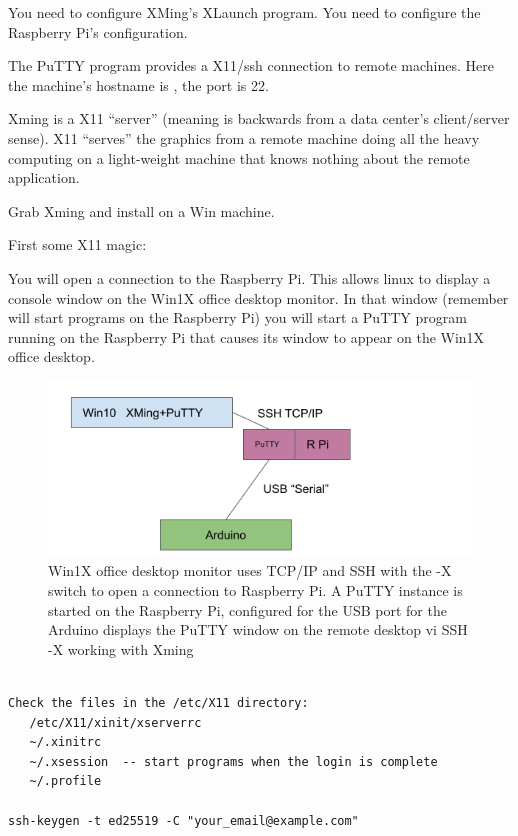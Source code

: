 You need to configure XMing's XLaunch program. You need to configure the
Raspberry Pi's configuration.


The PuTTY program provides a X11/ssh connection to remote machines. Here
the machine's hostname is , the port is 22.

Xming is a X11 ``server'' (meaning is backwards from a data center's
client/server sense). X11 ``serves'' the graphics from a remote machine
doing all the heavy computing on a light-weight machine that knows nothing
about the remote application.

Grab Xming and install on a Win machine.

First some X11 magic:

You will open a  connection to the Raspberry Pi. This
allows linux to display a console window on the Win1X office desktop
monitor. In that window (remember will start programs on the Raspberry
Pi) you will start a PuTTY program running on the Raspberry Pi that
causes its window to appear on the Win1X office desktop.

\begin{figure}[h!]
\centering
\includegraphics[width=.5\textwidth]{images/PuTTYDiagram1.png}
\caption[Win1X use.]{Win1X office desktop monitor uses TCP/IP and SSH
  with the -X switch to open a connection to Raspberry Pi. A PuTTY
  instance is started on the Raspberry Pi, configured for the USB port
  for the Arduino displays the PuTTY window on the remote desktop vi
  SSH -X working with Xming} %
\label{figure:Diagram1}
\end{figure}

\begingroup \fontsize{10pt}{10pt}
\selectfont
\begin{verbatim} 

Check the files in the /etc/X11 directory:
   /etc/X11/xinit/xserverrc
   ~/.xinitrc
   ~/.xsession  -- start programs when the login is complete
   ~/.profile

ssh-keygen -t ed25519 -C "your_email@example.com"

\end{verbatim}
\endgroup

